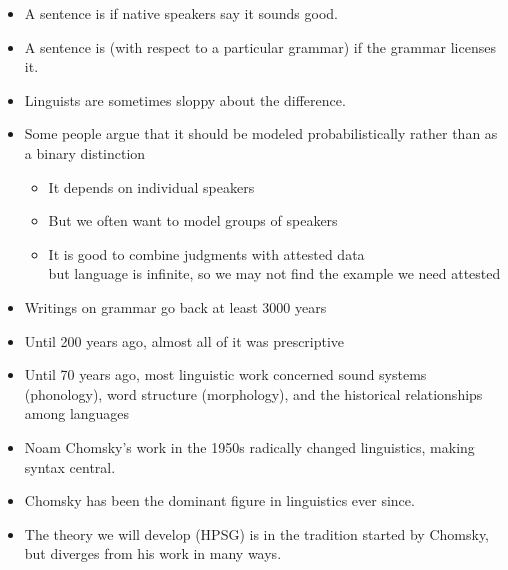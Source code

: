\documentclass[a4paper,landscape,headrule,footrule]{foils}
\begin{document}

\begin{exe}
\ex  {}
\ex  {}
\ex  {}
\end{exe}


\begin{itemize}
\item A sentence is  if native speakers
say it sounds good.

\item A sentence is  (with respect to
a particular grammar) if the grammar
licenses it.

\item Linguists are sometimes sloppy about the
difference.

\item Some people argue that it should be modeled probabilistically
  rather than as a binary distinction
  \begin{itemize}
  \item It depends on individual speakers
  \item But we often want to model groups of speakers
  \item It is good to combine judgments with attested data
    \\ but language is infinite, so we may not find the example we need attested
  \end{itemize}
\end{itemize}

\begin{itemize}
\item Writings on grammar go back at least 3000 years
\item Until 200 years ago, almost all of it was prescriptive
\item Until 70 years ago, most linguistic work concerned sound systems (phonology),
word structure (morphology), and the historical relationships among
languages
\end{itemize}

\begin{itemize}
\item Noam Chomsky’s work in the 1950s
radically changed linguistics, making
syntax central.
\item Chomsky has been the dominant figure
in linguistics ever since.
\item The theory we will develop (HPSG) is in the
tradition started by Chomsky, but
diverges from his work in many ways.
\end{itemize}
\end{document}

